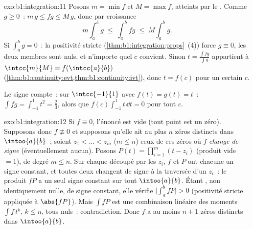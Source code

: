 \begin{solution}{exo:b1:integration:11}
Posons $m = \min f$ et $M = \max f$, atteints par le . Comme $g \geq 0$~: $m\,g \leq fg \leq M\,g$, donc
par croissance
\[
m \int_a^b g \;\leq\; \int_a^b fg \;\leq\; M \int_a^b g .
\]
Si $\int_a^b g = 0$~: la positivité stricte
(\cref{thm:b1:integration:props}~(4)) force $g \equiv 0$, les deux
membres sont nuls, et n'importe quel $c$ convient. Sinon $t =
\frac{\int fg}{\int g}$ appartient à $\intcc{m}{M} =
f(\intcc{a}{b})$ (\cref{thm:b1:continuity:evt,thm:b1:continuity:ivt}),
donc $t = f(c)$ pour un certain $c$.

Le signe compte~: sur $\intcc{-1}{1}$ avec $f(t) = g(t) = t$~: $\int
fg = \int_{-1}^1 t^2 = \frac23$, alors que $f(c)\int_{-1}^1 t\,\dd t
= 0$ pour tout $c$.
\end{solution}

\begin{solution}{exo:b1:integration:12}
Si $f \equiv 0$, l'énoncé est vide (tout point est un zéro).
Supposons donc $f \not\equiv 0$ et supposons qu'elle ait au plus $n$
zéros distincts dans $\intoo{a}{b}$~; soient $z_1 < \dots < z_m$ ($m
\leq n$) ceux de ces zéros où $f$ \emph{change de signe}
(éventuellement aucun). Posons $P(t) = \prod_{i=1}^{m}(t - z_i)$
(produit vide $= 1$), de degré $m \leq n$. Sur chaque
 découpé par les $z_i$, $f$ et $P$ ont chacune un
signe constant, et toutes deux changent de signe à la traversée d'un
$z_i$~: le produit $fP$ a un seul signe constant sur tout
$\intoo{a}{b}$. Étant , non identiquement nulle, de signe
constant, elle vérifie $\bigl|\int_a^b fP\bigr| > 0$ (positivité
stricte appliquée à $\abs{fP}$). Mais $\int f P$ est une combinaison
linéaire des moments $\int f\,t^k$, $k \leq n$, tous nuls~:
contradiction. Donc $f$ a au moins $n + 1$ zéros distincts dans
$\intoo{a}{b}$.
\end{solution}

